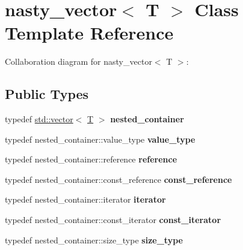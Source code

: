 \hypertarget{classnasty__vector}{}\section{nasty\+\_\+vector$<$ T $>$ Class Template Reference}
\label{classnasty__vector}


Collaboration diagram for nasty\+\_\+vector$<$ T $>$\+:
\subsection*{Public Types}
\begin{DoxyCompactItemize}
\item 
\mbox{\label{classnasty__vector_ac3072b250a361ef23a4928ed4caa31c6}} 
typedef \mbox{\hyperlink{classstd_1_1vector}{std\+::vector}}$<$ \mbox{\hyperlink{struct_t}{T}} $>$ {\bfseries nested\+\_\+container}
\item 
\mbox{\label{classnasty__vector_a8b6e6c9d9825a7b7406717d54a4bcca4}} 
typedef nested\+\_\+container\+::value\+\_\+type {\bfseries value\+\_\+type}
\item 
\mbox{\label{classnasty__vector_a086982eebf093bef7d9e9dfce46c978a}} 
typedef nested\+\_\+container\+::reference {\bfseries reference}
\item 
\mbox{\label{classnasty__vector_a759e7dd8efbe2952d3536abed77ac06d}} 
typedef nested\+\_\+container\+::const\+\_\+reference {\bfseries const\+\_\+reference}
\item 
\mbox{\label{classnasty__vector_ab80abc731a4918885b948896cd35df7c}} 
typedef nested\+\_\+container\+::iterator {\bfseries iterator}
\item 
\mbox{\label{classnasty__vector_a0fcd80e0c1d83175552cc97a0285d76e}} 
typedef nested\+\_\+container\+::const\+\_\+iterator {\bfseries const\+\_\+iterator}
\item 
\mbox{\label{classnasty__vector_ab3a78f8c8d7ea753cb9c6895a9fa77a1}} 
typedef nested\+\_\+container\+::size\+\_\+type {\bfseries size\+\_\+type}
\item 

\end{DoxyCompactItemize}

